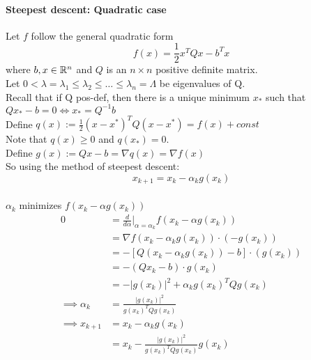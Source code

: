 \documentclass[11pt]{article}
\begin{document}
\paragraph{Steepest descent: Quadratic case}
Let $f$ follow the general quadratic form
$$f(x) = \frac{1}{2} x^T Q x - b^T x$$
where $b, x \in \mathbb{R}^n$ and  $Q$ is an $n \times n$ positive definite matrix. \\
Let $0 < \lambda = \lambda_1 \leq \lambda_2 \leq \hdots \leq \lambda_n = \Lambda$ be eigenvalues of Q. \\
Recall that if Q pos-def, then there is a unique minimum $x_*$ such that $Qx_* - b = 0 \iff  x_* = Q^{-1}b$\\
Define
$q(x) := \frac{1}{2}(x - x^*)^TQ(x - x^*) = f(x) + const$ \\
Note that  $q(x) \geq 0$ and $q(x_*) = 0$. \\
Define $g(x) := Qx - b  = \nabla q(x) = \nabla f(x)$\\
So using the method of steepest descent: 
$$x_{k+1} = x_k - \alpha_k g(x_k)$$
 \\
$\alpha_k$ minimizes $f(x_k - \alpha g(x_k))$
\begin{align}
	0 &= \frac{d}{d\alpha}|_{\alpha = \alpha_k} f(x_k - \alpha g(x_k)) \\
	&= \nabla f(x_k - \alpha_k g(x_k)) \cdot (-g(x_k)) \\
	&= - [Q (x_k - \alpha_k g(x_k)) - b] \cdot (g(x_k)) \\
	&= -(Q x_k - b) \cdot g(x_k) \\
	&= - |g(x_k)|^2 + \alpha_k g(x_k)^T Q g(x_k) \\
	\implies \alpha_k &= \frac{|g(x_k)|^2}{g(x_k)^TQg(x_k)}\\
	\implies x_{k+1} &= x_k - \alpha_k g(x_k) \\
	&= x_k - \frac{|g(x_k)|^2}{g(x_k)^T Q g(x_k)} g(x_k)
\end{align}
\end{document}
